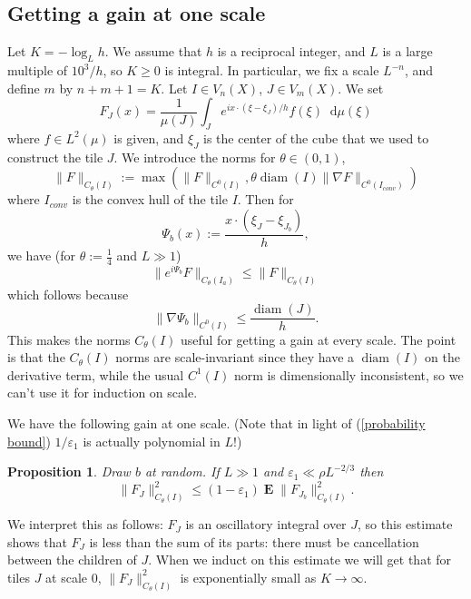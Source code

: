 \documentclass[reqno,12pt]{amsart}
\DeclareMathOperator*{\Expect}{\mathbf E}
\newcommand*\dif{\mathop{}\!\mathrm{d}}
\DeclareMathOperator{\diam}{diam}
\newtheorem{proposition}[theorem]{Proposition}
\theoremstyle{definition}
\numberwithin{equation}{section}
\begin{document}
\subsection{Getting a gain at one scale}
Let $K = -\log_L h$. We assume that $h$ is a reciprocal integer, and $L$ is a large multiple of $10^3/h$, so $K \geq 0$ is integral.
In particular, we fix a scale $L^{-n}$, and define $m$ by $n + m + 1 = K$.
Let $I \in V_n(X)$, $J \in V_m(X)$.
We set 
$$F_J(x) = \frac{1}{\mu(J)} \int_J e^{ix \cdot (\xi - \xi_J)/h} f(\xi) \dif \mu(\xi)$$
where $f \in L^2(\mu)$ is given, and $\xi_J$ is the center of the cube that we used to construct the tile $J$.
We introduce the norms for $\theta \in (0, 1)$,
$$\|F\|_{C_\theta(I)} := \max(\|F\|_{C^0(I)}, \theta \diam(I) \|\nabla F\|_{C^0(I_{conv})})$$
where $I_{conv}$ is the convex hull of the tile $I$. Then for 
$$\Psi_b(x) := \frac{x \cdot (\xi_J - \xi_{J_b})}{h},$$
we have (for $\theta := \frac{1}{4}$ and $L \gg 1$)
\begin{equation}\label{induction on scale Ctheta}
    \|e^{i\Psi_b} F\|_{C_\theta(I_a)} \leq \|F\|_{C_\theta(I)}
\end{equation}
which follows because 
$$\|\nabla \Psi_b\|_{C^0(I)} \leq \frac{\diam(J)}{h}.$$
This makes the norms $C_\theta(I)$ useful for getting a gain at every scale.
The point is that the $C_\theta(I)$ norms are scale-invariant since they have a $\diam(I)$ on the derivative term, while the usual $C^1(I)$ norm is dimensionally inconsistent, so we can't use it for induction on scale.

We have the following gain at one scale.
(Note that in light of (\ref{probability bound}) $1/\varepsilon_1$ is actually polynomial in $L$!)

\begin{proposition}
Draw $b$ at random.
If $L \gg 1$ and $\varepsilon_1 \ll \rho L^{-2/3}$ then 
$$\|F_J\|_{C_\theta(I)}^2 \leq (1 - \varepsilon_1) \Expect \|F_{J_b}\|_{C_\theta(I)}^2.$$
\end{proposition}

We interpret this as follows: $F_J$ is an oscillatory integral over $J$, so this estimate shows that $F_J$ is less than the sum of its parts: there must be cancellation between the children of $J$.
When we induct on this estimate we will get that for tiles $J$ at scale $0$, $\|F_J\|_{C_\theta(I)}^2$ is exponentially small as $K \to \infty$.  


\end{document}

